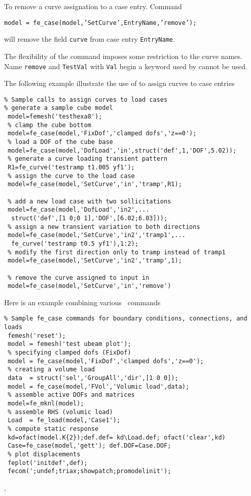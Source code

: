 \vs

To remove a curve assignation to a case entry. Command

{\tt model = fe\_case(model,'SetCurve',EntryName,'remove');}

will remove the field {\tt curve} from case entry {\tt EntryName}.


\vs The flexibility of the command imposes some restriction to the curve names. Name {\tt remove} and {\tt TestVal} with {\tt Val} begin a keyword used by  cannot be used.

\vs

The following example illustrate the use of  to assign curves to case entries

\begin{verbatim}
% Sample calls to assign curves to load cases
% generate a sample cube model
 model=femesh('testhexa8'); 
 % clamp the cube bottom
 model=fe_case(model,'FixDof','clamped dofs','z==0');
 % load a DOF of the cube base
 model=fe_case(model,'DofLoad','in',struct('def',1,'DOF',5.02));
 % generate a curve loading transient pattern
 R1=fe_curve('testramp t1.005 yf1');
 % assign the curve to the load case
 model=fe_case(model,'SetCurve','in','tramp',R1);
 
 % add a new load case with two sollicitations
 model=fe_case(model,'DofLoad','in2',...
  struct('def',[1 0;0 1],'DOF',[6.02;6.03]));
 % assign a new transient variation to both directions
 model=fe_case(model,'SetCurve','in2','tramp1',...
  fe_curve('testramp t0.5 yf1'),1:2);
 % modify the first direction only to tramp instead of tramp1
 model=fe_case(model,'SetCurve','in2','tramp',1);
 
 % remove the curve assigned to input in
 model=fe_case(model,'SetCurve','in','remove')
\end{verbatim}%



Here is an example combining various \fecase\ commands

\begin{verbatim}
% Sample fe_case commands for boundary conditions, connections, and loads
 femesh('reset');
 model = femesh('test ubeam plot');
 % specifying clamped dofs (FixDof) 
 model = fe_case(model,'FixDof','clamped dofs','z==0');
 % creating a volume load
 data  = struct('sel','GroupAll','dir',[1 0 0]);
 model = fe_case(model,'FVol','Volumic load',data);
 % assemble active DOFs and matrices
 model=fe_mknl(model);
 % assemble RHS (volumic load)
 Load  = fe_load(model,'Case1');
 % compute static response
 kd=ofact(model.K{2});def.def= kd\Load.def; ofact('clear',kd)
 Case=fe_case(model,'gett'); def.DOF=Case.DOF;
 % plot displacements
 feplot('initdef',def);
 fecom(';undef;triax;showpatch;promodelinit');
\end{verbatim}%


\noindent \femk, \fecase








